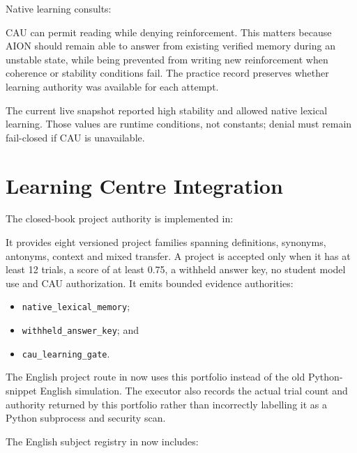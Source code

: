 \documentclass[11pt,a4paper]{article}
\begin{document}
Native learning consults:

\begin{quote}
\end{quote}

CAU can permit reading while denying reinforcement. This matters because AION should remain
able to answer from existing verified memory during an unstable state, while being prevented
from writing new reinforcement when coherence or stability conditions fail. The practice
record preserves whether learning authority was available for each attempt.

The current live snapshot reported high stability and allowed native lexical learning. Those
values are runtime conditions, not constants; denial must remain fail-closed if CAU is
unavailable.

\section{Learning Centre Integration}

The closed-book project authority is implemented in:

\begin{quote}
\end{quote}

It provides eight versioned project families spanning definitions, synonyms, antonyms,
context and mixed transfer. A project is accepted only when it has at least 12 trials, a score
of at least 0.75, a withheld answer key, no student model use and CAU authorization. It emits
bounded evidence authorities:

\begin{itemize}
  \item \texttt{native\_lexical\_memory};
  \item \texttt{withheld\_answer\_key}; and
  \item \texttt{cau\_learning\_gate}.
\end{itemize}

The English project route in
 now uses this portfolio
instead of the old Python-snippet English simulation. The executor also records the actual
trial count and authority returned by this portfolio rather than incorrectly labelling it as
a Python subprocess and security scan.

The English subject registry in
 now includes:
\end{document}

